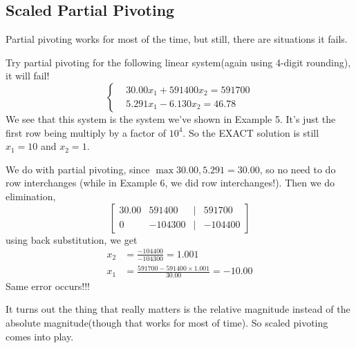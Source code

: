 	\subsection*{Scaled Partial Pivoting}
	Partial pivoting works for most of the time, but still, there are situations it fails. 
	\begin{ex}
		Try partial pivoting for the following linear system(again using 4-digit rounding), it will fail!
		\[ \begin{cases}
		&30.00x_1 + 591400x_2 = 591700\\
		&5.291x_1 - 6.130x_2 = 46.78
		\end{cases} \]
		We see that this system is the system we've shown in Example 5. It's just the first row being multiply by a factor of $10^4$. So the EXACT solution is still $x_1 = 10$ and $x_2 = 1$.
		
		We do with partial pivoting, since $\max{30.00, 5.291} = 30.00$, so no need to do row interchanges (while in Example 6, we did row interchanges!). Then we do elimination,
		\[ \begin{bmatrix}
		30.00 & 591400 & \vert &591700\\
		0     &-104300 & \vert & -104400

		\end{bmatrix} \]
		using back substitution, we get 
		\begin{align*}
		x_2 &= \frac{-104400}{-104300} = 1.001\\
		x_1 &= \frac{591700 - 591400\times1.001}{30.00} = -10.00
		\end{align*}
		Same error occurs!!!
	\end{ex}

	It turns out the thing that really matters is the relative magnitude instead of the absolute magnitude(though that works for most of time). So scaled pivoting comes into play. 
	
